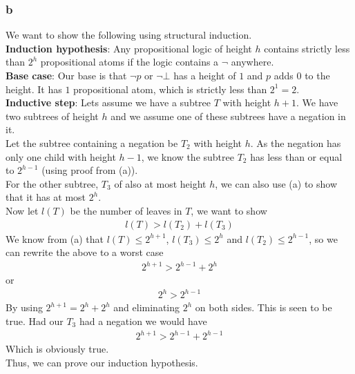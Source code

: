 \documentclass[12pt]{article}
\begin{document}
\subsubsection*{b}
We want to show the following using structural induction.\\
\textbf{Induction hypothesis}: Any propositional logic of height $h$ contains strictly less than $2^h$ propositional atoms if the logic contains a $\neg$ anywhere. \\
\textbf{Base case}: Our base is that $\neg p$ or $\neg\bot$ has a height of $1$ and $p$ adds $0$ to the height. It has $1$ propositional atom, which is strictly less than $2^1=2$.\\
\textbf{Inductive step}: Lets assume we have a subtree $T$ with height $h+1$. We have two subtrees of height $h$ and we assume one of these subtrees have a negation in it.\\
Let the subtree containing a negation be $T_2$ with height $h$. As the negation has only one child with height $h-1$, we know the subtree $T_2$ has less than or equal to $2^{h-1}$ (using proof from (a)).\\
For the other subtree, $T_3$ of also at most height $h$, we can also use (a) to show that it has at most $2^{h}$.\\
Now let $l(T)$ be the number of leaves in $T$, we want to show
\begin{align*}
l(T)>l(T_2)+l(T_3)
\end{align*}
We know from (a) that $l(T)\leq 2^{h+1}$, $l(T_3)\leq 2^h$ and $l(T_2)\leq 2^{h-1}$, so we can rewrite the above to a worst case
\begin{align*}
2^{h+1}>2^{h-1}+2^h
\end{align*}
or
\begin{align*}
2^h>2^{h-1}
\end{align*}
By using $2^{h+1}=2^h+2^h$ and eliminating $2^h$ on both sides. This is seen to be true. Had our $T_3$ had a negation we would have
\begin{align*}
2^{h+1}>2^{h-1}+2^{h-1}
\end{align*}
Which is obviously true. \\
Thus, we can prove our induction hypothesis.
\end{document}
